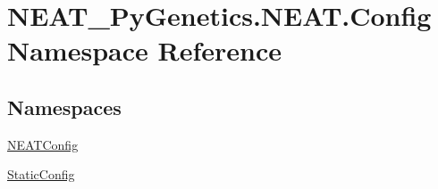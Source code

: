 \hypertarget{namespaceNEAT__PyGenetics_1_1NEAT_1_1Config}{}\section{N\+E\+A\+T\+\_\+\+Py\+Genetics.\+N\+E\+A\+T.\+Config Namespace Reference}
\label{namespaceNEAT__PyGenetics_1_1NEAT_1_1Config}
\subsection*{Namespaces}
\begin{DoxyCompactItemize}
\item 
 \hyperlink{namespaceNEAT__PyGenetics_1_1NEAT_1_1Config_1_1NEATConfig}{N\+E\+A\+T\+Config}
\item 
 \hyperlink{namespaceNEAT__PyGenetics_1_1NEAT_1_1Config_1_1StaticConfig}{Static\+Config}
\end{DoxyCompactItemize}
